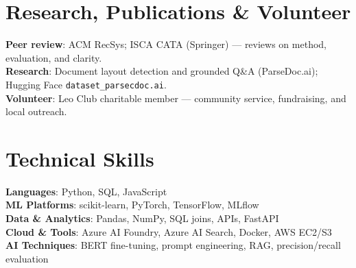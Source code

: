 \documentclass[letterpaper,11pt]{article}
\begin{document}
\section{Research, Publications \& Volunteer}
 \begin{itemize}[leftmargin=0.15in, label={}, topsep=1pt]
    \small{\item{
     \textbf{Peer review}{: ACM RecSys; ISCA CATA (Springer) --- reviews on method, evaluation, and clarity.} \\
     \textbf{Research}{: Document layout detection and grounded Q\&A (ParseDoc.ai); Hugging Face \texttt{dataset\_parsecdoc.ai}.} \\
     \textbf{Volunteer}{: Leo Club charitable member --- community service, fundraising, and local outreach.}
    }}
 \end{itemize}

\section{Technical Skills}
 \begin{itemize}[leftmargin=0.15in, label={}]
    \small{\item{
     \textbf{Languages}{: Python, SQL, JavaScript} \\
     \textbf{ML Platforms}{: scikit-learn, PyTorch, TensorFlow, MLflow} \\
     \textbf{Data \& Analytics}{: Pandas, NumPy, SQL joins, APIs, FastAPI} \\
     \textbf{Cloud \& Tools}{: Azure AI Foundry, Azure AI Search, Docker, AWS EC2/S3} \\
     \textbf{AI Techniques}{: BERT fine-tuning, prompt engineering, RAG, precision/recall evaluation}

    }}
 \end{itemize}
\end{document}

